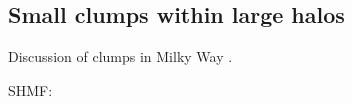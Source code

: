\subsection{Small clumps within large halos}
Discussion of clumps in Milky Way \cite{Belotsky_2014}.

SHMF:
\cite{Bosch_2014}
\cite{Cautun_2014}